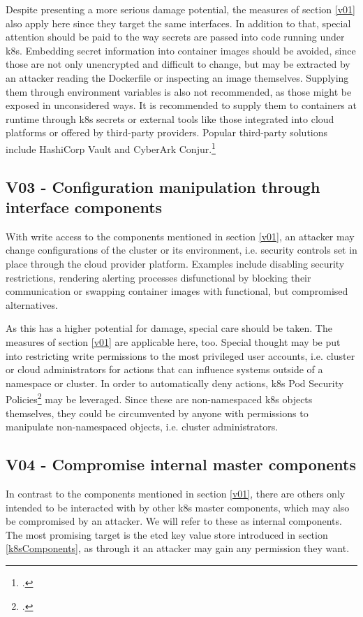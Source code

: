 Despite presenting a more serious damage potential, the measures of section \ref{v01} also apply here since they target the same interfaces.
In addition to that, special attention should be paid to the way secrets are passed into code running under \gls{k8s}. Embedding secret information into container images should be avoided, since those are not only unencrypted and difficult to change, but may be extracted by an attacker reading the Dockerfile or inspecting an image themselves. Supplying them through environment variables is also not recommended, as those might be exposed in unconsidered ways. It is recommended to supply them to containers at runtime through \gls{k8s} secrets or external tools like those integrated into cloud platforms or offered by third-party providers. Popular third-party solutions include HashiCorp Vault and CyberArk Conjur.\footcite[][, chapter 7]{k8sBook}

\subsection{V03 - Configuration manipulation through interface components}
With write access to the components mentioned in section \ref{v01}, an attacker may change configurations of the cluster or its environment, i.e. security controls set in place through the cloud provider platform. Examples include disabling security restrictions, rendering alerting processes disfunctional by blocking their communication or swapping container images with functional, but compromised alternatives.

As this has a higher potential for damage, special care should be taken. The measures of section \ref{v01} are applicable here, too. Special thought may be put into restricting write permissions to the most privileged user accounts, i.e. cluster or cloud administrators for actions that can influence systems outside of a namespace or cluster.
In order to automatically deny actions, \gls{k8s} Pod Security Policies\footcite[][, section 'What is a Pod Security Policy?']{securityPolicy} may be leveraged. Since these are non-namespaced \gls{k8s} objects themselves, they could be circumvented by anyone with permissions to manipulate non-namespaced objects, i.e. cluster administrators.

\subsection{V04 - Compromise internal master components}
In contrast to the components mentioned in section \ref{v01}, there are others only intended to be interacted with by other \gls{k8s} master components, which may also be compromised by an attacker. We will refer to these as internal components.
The most promising target is the etcd key value store introduced in section \ref{k8sComponents}, as through it an attacker may gain any permission they want.

